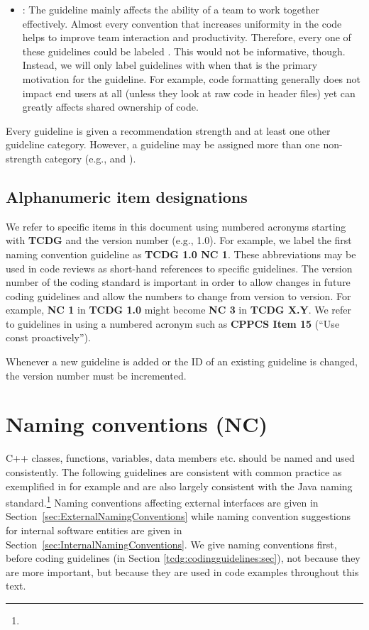 \begin{itemize}
{}\item\textbf{\TeamGC}: The guideline mainly affects the ability of a
team to work together effectively.  Almost every convention that
increases uniformity in the code helps to improve team interaction and
productivity.  Therefore, every one of these guidelines could be
labeled {}\TeamGC{}.  This would not be informative, though.  Instead,
we will only label guidelines with {}\TeamGC{} when that is the
primary motivation for the guideline.  For example, code formatting
generally does not impact end users at all (unless they look at raw
code in header files) yet can greatly affects shared ownership of
code.

\end{itemize}

Every guideline is given a recommendation strength and at least one
other guideline category.  However, a guideline may be assigned more
than one non-strength category (e.g., \InteropGC{} and \SafetyGC).


%
\subsection{Alphanumeric item designations}
\label{sec:alpha_numeric_designations}
%

We refer to specific items in this document using numbered acronyms
starting with \textbf{TCDG} and the version number (e.g., 1.0).  For
example, we label the first naming convention guideline as
\textbf{TCDG 1.0 NC 1}.  These abbreviations may be used in code
reviews as short-hand references to specific guidelines.  The version
number of the coding standard is important in order to allow changes
in future coding guidelines and allow the numbers to change from
version to version.  For example, \textbf{NC 1} in \textbf{TCDG
  1.0} might become \textbf{NC 3} in \textbf{TCDG X.Y}.  We refer
to guidelines in \cite{C++CodingStandards05} using a numbered
acronym such as \textbf{CPPCS Item 15} (``Use const proactively'').

Whenever a new guideline is added or the ID of an existing guideline
is changed, the version number must be incremented.


%
\section{Naming conventions (NC)}
\label{sec:NamingConventions}
%

C++ classes, functions, variables, data members etc. should be named
and used consistently.  The following guidelines are consistent with
common practice as exemplified in {}\cite{EffectiveC++3rd05} for
example and are also largely consistent with the Java naming
standard.\footnote{
  {}}
Naming conventions affecting external interfaces are given in
Section~\ref{sec:ExternalNamingConventions} while naming convention
suggestions for internal software entities are given in
Section~\ref{sec:InternalNamingConventions}.  We give naming
conventions first, before coding guidelines (in Section
\ref{tcdg:codingguidelines:sec}), not because they are more important,
but because they are used in code examples throughout this text.


